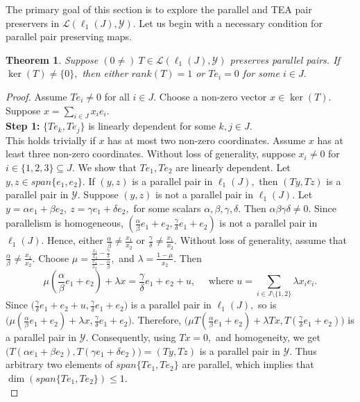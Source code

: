 \documentclass{amsart}
\newtheorem{theorem}{Theorem}[section]
\theoremstyle{definition}
\theoremstyle{remark}
\numberwithin{equation}{section}
\begin{document}
The primary goal of this section is to explore the parallel and TEA pair preservers in $\mathcal{L}(\ell_1(J),\mathcal{Y}).$ 
Let us begin with a necessary condition for parallel pair preserving maps.


\begin{theorem}\label{th-rank}
	Suppose $(0\neq)~T\in \mathcal{L}(\ell_1(J),\mathcal{Y})$  preserves parallel pairs.  If $\ker(T)\neq \{0\},$ then  either $rank(T)=1$ or $Te_i=0$ for some $i\in J.$	
\end{theorem}
\begin{proof}
	 Assume $Te_i\neq 0$ for all $i\in J.$ Choose a non-zero vector  $x\in \ker(T).$ Suppose $x=\sum_{i\in J}x_ie_i.$\\
	\textbf{Step 1:} $\{Te_k,Te_j\}$ is linearly dependent for some $k,j\in J.$\\
	This holds trivially if $x$ has at most two non-zero coordinates.  Assume $x$ has at least three non-zero coordinates.  Without loss of generality, suppose $x_i\neq 0$ for $i\in\{1,2,3\}\subseteq J.$ We  show that $Te_1,Te_2$ are linearly dependent. Let $y,z\in span\{e_1,e_2\}.$ If $(y,z)$ is a parallel pair in $\ell_1(J),$ then $(Ty,Tz)$ is a parallel pair in $\mathcal{Y}.$ Suppose $(y,z)$ is not a parallel pair in $\ell_1(J).$ Let $y=\alpha e_1+\beta e_2,~z=\gamma e_1+\delta e_2,$ for some scalars $\alpha,\beta,\gamma,\delta.$ Then $\alpha\beta\gamma\delta\neq 0.$ Since parallelism is homogeneous, $(\frac{\alpha}{\beta}e_1+e_2,\frac{\gamma}{\delta}e_1+e_2)$ is not a parallel pair in $\ell_1(J).$ Hence, either $\frac{\alpha}{\beta}\neq \frac{x_1}{x_2}$ or $\frac{\gamma}{\delta}\neq  \frac{x_1}{x_2}.$ Without loss of generality, assume that $\frac{\alpha}{\beta}\neq  \frac{x_1}{x_2}.$ Choose $\mu=\frac{\frac{x_1}{x_2}-\frac{\gamma}{\delta}}{\frac{x_1}{x_2}-\frac{\alpha}{\beta}},$ and $\lambda=\frac{1-\mu}{x_2}.$  Then 
	\[\mu(\frac{\alpha}{\beta}e_1+e_2)+\lambda x=\frac{\gamma}{\delta}e_1+e_2+u,\quad  \text{ where } u=\sum_{i\in J\setminus\{1,2\}}\lambda x_ie_i.\]
	Since $\Big(\frac{\gamma}{\delta}e_1+e_2+u,\frac{\gamma}{\delta}e_1+e_2\Big)$ is a parallel pair in $\ell_1(J),$ so is $\Big(\mu(\frac{\alpha}{\beta}e_1+e_2)+\lambda x,\frac{\gamma}{\delta}e_1+e_2\Big).$ Therefore, $\Big(\mu T(\frac{\alpha}{\beta}e_1+e_2)+\lambda Tx,T(\frac{\gamma}{\delta}e_1+e_2)\Big)$ is a parallel pair in $ \mathcal{Y}.$ Consequently, using $Tx=0,$ and homogeneity, we get  $\Big( T(\alpha e_1+\beta e_2),T(\gamma e_1+\delta e_2)\Big)=(Ty,Tz)$ is a parallel pair in $ \mathcal{Y}.$ Thus arbitrary two elements of $span\{Te_1,Te_2\}$ are parallel, which implies that $\dim(span\{Te_1,Te_2\})\leq 1.$\\

\end{proof}
\end{document}
